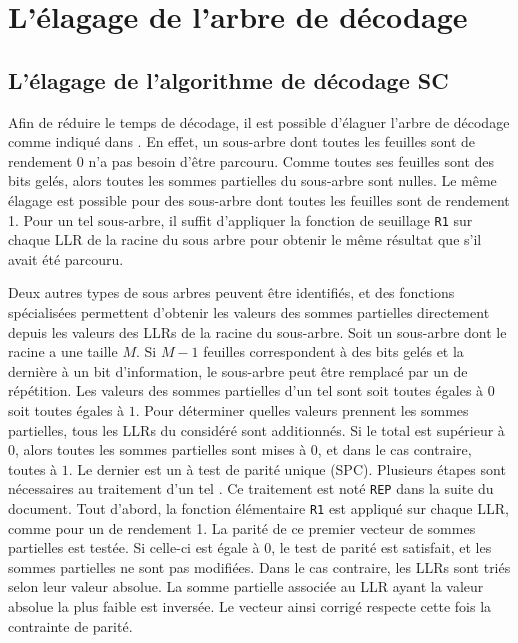 \section{L'élagage de l'arbre de décodage}


\subsection{L'élagage de l'algorithme de décodage SC}
Afin de réduire le temps de décodage, il est possible d'élaguer l'arbre de décodage comme indiqué dans \cite{alamdar-yazdi_simplified_2011}. En effet, un sous-arbre dont toutes les feuilles sont de rendement 0 n'a pas besoin d'être parcouru. Comme toutes ses feuilles sont des bits gelés, alors toutes les sommes partielles du sous-arbre sont nulles. Le même élagage est possible pour des sous-arbre dont toutes les feuilles sont de rendement 1. Pour un tel sous-arbre, il suffit d'appliquer la fonction de seuillage \texttt{R1} sur chaque LLR de la racine du sous arbre pour obtenir le même résultat que s'il avait été parcouru.

Deux autres types de sous arbres peuvent être identifiés, et des fonctions spécialisées permettent d'obtenir les valeurs des sommes partielles directement depuis les valeurs des LLRs de la racine du sous-arbre. Soit un sous-arbre dont le \noeud racine a une taille $M$. Si $M-1$ feuilles correspondent à des bits gelés et la dernière à un bit d'information, le sous-arbre peut être remplacé par un \noeud de répétition. Les valeurs des sommes partielles d'un tel \noeud sont soit toutes égales à $0$ soit toutes égales à $1$. Pour déterminer quelles valeurs prennent les sommes partielles, tous les LLRs du \noeud considéré sont additionnés. Si le total est supérieur à 0, alors toutes les sommes partielles sont mises à $0$, et dans le cas contraire, toutes à $1$. Le dernier est un \noeud à test de parité unique (SPC). Plusieurs étapes sont nécessaires au traitement d'un tel \noeud. Ce traitement est noté \texttt{REP} dans la suite du document. Tout d'abord, la fonction élémentaire \texttt{R1} est appliqué sur chaque LLR, comme pour un \noeud de rendement 1. La parité de ce premier vecteur de sommes partielles est testée. Si celle-ci est égale à 0, le test de parité est satisfait, et les sommes partielles ne sont pas modifiées. Dans le cas contraire, les LLRs sont triés selon leur valeur absolue. La somme partielle associée au LLR ayant la valeur absolue la plus faible est inversée. Le vecteur ainsi corrigé respecte cette fois la contrainte de parité.

